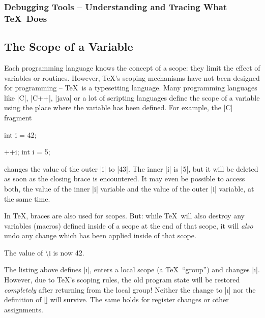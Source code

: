 \subsubsection{Debugging Tools -- Understanding and Tracing What \TeX\ Does}
\begin{command}{\message{}}
\end{command}
\begin{command}{\meaning{}}
\end{command}
\begin{command}{}
\end{command}
\begin{command}{}
\end{command}
\begin{command}{}
\end{command}

\subsection{The Scope of a Variable}
\label{sec:scopes}
Each programming language knows the concept of a scope: they limit the effect of variables or routines. However, \TeX's scoping mechanisms have not been designed for programming -- \TeX\ is a typesetting language. Many programming languages like |C|, |C++|, |java| or a lot of scripting languages define the scope of a variable using the place where the variable has been defined. For example, the |C| fragment
\begin{codeexample}
int i = 42;

{
	++i;
	int i = 5;
}
\end{codeexample}
\noindent changes the value of the outer |i| to |43|. The inner |i| is |5|, but it will be deleted as soon as the closing brace is encountered. It may even be possible to access both, the value of the inner |i| variable and the value of the outer |i| variable, at the same time.

In \TeX, braces are also used for scopes. But: while \TeX\ will also destroy any variables (macros) defined inside of a scope at the end of that scope, it will \emph{also} undo any change which has been applied inside of that scope.
\begin{codeexample}[]
\def\i{42}
{
	\def\i{43}
	\def\b{2}
}
The value of \textbackslash i is now \i.
\end{codeexample}
\noindent The listing above defines |\i|, enters a local scope (a \TeX\ ``group'') and changes |\i|. However, due to \TeX's scoping rules, the old program state will be restored \emph{completely} after returning from the local group! Neither the change to |\i| nor the definition of |\b| will survive. The same holds for register changes or other assignments.


